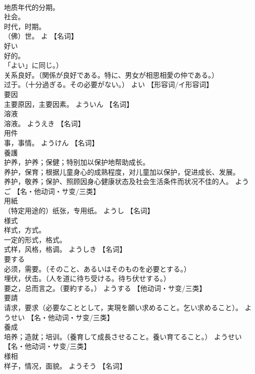 \documentclass[8pt]{extreport}
\begin{document}
\begin{CJK}{UTF8}{min}
\\	地质年代的分期。 
\\	社会。 
\\	时代，时期。 
\\	（佛）世。	よ		【名词】
\\	好い	
\\	好的。
\\	「よい」に同じ。） 
\\	关系良好。（関係が良好である。特に、男女が相思相愛の仲である。） 
\\	过于。（十分過ぎる。その必要がない。）	よい		【形容词/イ形容词】
\\	要因	
\\	主要原因，主要因素。	よういん		【名词】
\\	溶液	
\\	溶液。	ようえき		【名词】
\\	用件	
\\	事，事情。	ようけん		【名词】
\\	養護	
\\	护养，护养；保健；特别加以保护地帮助成长。 
\\	养护，保育；根据儿童身心的成熟程度，对儿童加以保护，促进成长、发展。 
\\	养护，敬养；保护、照顾因身心健康状态及社会生活条件而状况不佳的人。	ようご		【名・他动词・サ变/三类】
\\	用紙	
\\	（特定用途的）纸张，专用纸。	ようし		【名词】
\\	様式	
\\	样式，方式。 
\\	一定的形式，格式。 
\\	式样，风格，格调。	ようしき		【名词】
\\	要する	
\\	必须，需要。（そのこと、あるいはそのものを必要とする。） 
\\	埋伏，伏击。（人を道に待ち受ける。待ち伏せする。） 
\\	要之，总而言之。（要約する。）	ようする		【他动词・サ变/三类】
\\	要請	
\\	请求，要求（必要なこととして，実現を願い求めること。乞い求めること）。	ようせい		【名・他动词・サ变/三类】
\\	養成	
\\	培养；造就；培训。（養育して成長させること。養い育てること。）	ようせい		【名・他动词・サ变/三类】
\\	様相	
\\	样子，情况，面貌。	ようそう		【名词】

\end{CJK}
\end{document}
